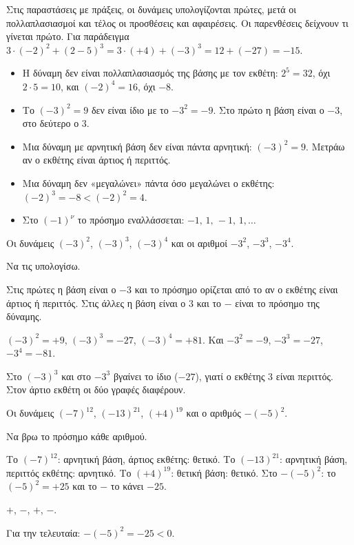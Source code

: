 Στις παραστάσεις με πράξεις, οι δυνάμεις υπολογίζονται πρώτες, μετά οι πολλαπλασιασμοί και τέλος οι προσθέσεις και αφαιρέσεις. Οι παρενθέσεις δείχνουν τι γίνεται πρώτο. Για παράδειγμα $3\cdot(-2)^2+(2-5)^3=3\cdot(+4)+(-3)^3=12+(-27)=-15$.

\begin{prosoxi}
\begin{itemize}[leftmargin=1.2em,itemsep=0.3ex,topsep=2pt]
\item Η δύναμη δεν είναι πολλαπλασιασμός της βάσης με τον εκθέτη: $2^5=32$, όχι $2\cdot5=10$, και $(-2)^4=16$, όχι $-8$.
\item Το $(-3)^2=9$ δεν είναι ίδιο με το $-3^2=-9$. Στο πρώτο η βάση είναι ο $-3$, στο δεύτερο ο $3$.
\item Μια δύναμη με αρνητική βάση δεν είναι πάντα αρνητική: $(-3)^2=9$. Μετράω αν ο εκθέτης είναι άρτιος ή περιττός.
\item Μια δύναμη δεν «μεγαλώνει» πάντα όσο μεγαλώνει ο εκθέτης: $(-2)^3=-8<(-2)^2=4$.
\item Στο $(-1)^{\nu}$ το πρόσημο εναλλάσσεται: $-1,\,1,\,-1,\,1,\dots$
\end{itemize}
\end{prosoxi}


\tixero Οι δυνάμεις $(-3)^2$, $(-3)^3$, $(-3)^4$ και οι αριθμοί $-3^2$, $-3^3$, $-3^4$.\par
\tithelo Να τις υπολογίσω.\par
\possindeo Στις πρώτες η βάση είναι ο $-3$ και το πρόσημο ορίζεται από το αν ο εκθέτης είναι άρτιος ή περιττός. Στις άλλες η βάση είναι ο $3$ και το $-$ είναι το πρόσημο της δύναμης.\par
\apantisi $(-3)^2=+9$, $(-3)^3=-27$, $(-3)^4=+81$. Και $-3^2=-9$, $-3^3=-27$, $-3^4=-81$.\par
\elegxos Στο $(-3)^3$ και στο $-3^3$ βγαίνει το ίδιο ($-27$), γιατί ο εκθέτης $3$ είναι περιττός. Στον άρτιο εκθέτη οι δύο γραφές διαφέρουν.

\tixero Οι δυνάμεις $(-7)^{12}$, $(-13)^{21}$, $(+4)^{19}$ και ο αριθμός $-(-5)^2$.\par
\tithelo Να βρω το πρόσημο κάθε αριθμού.\par
\possindeo Το $(-7)^{12}$: αρνητική βάση, άρτιος εκθέτης: θετικό. Το $(-13)^{21}$: αρνητική βάση, περιττός εκθέτης: αρνητικό. Το $(+4)^{19}$: θετική βάση: θετικό. Στο $-(-5)^2$: το $(-5)^2=+25$ και το $-$ το κάνει $-25$.\par
\apantisi $+$, $-$, $+$, $-$.\par
\elegxos Για την τελευταία: $-(-5)^2=-25<0$.

